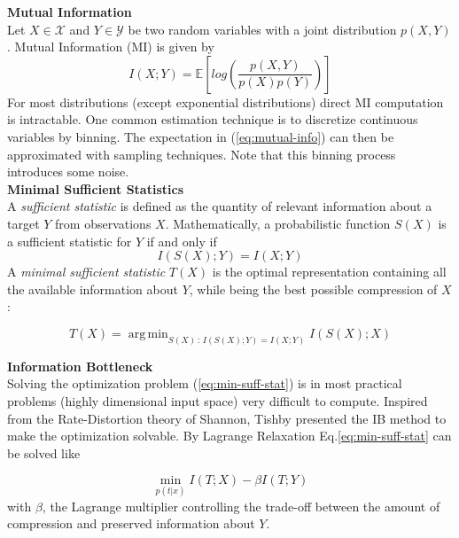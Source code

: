 \documentclass[twocolumn,superscriptaddress,aps]{revtex4-1}
\DeclareMathOperator*{\argmin}{arg\,min}
\begin{document}
\noindent \textbf{Mutual Information} \\[0.15cm]
\indent Let $X \in \mathcal{X}$ and $Y \in \mathcal{Y}$ be two random variables with a joint distribution $p(X,Y)$. Mutual Information (MI) is given by 
\begin{equation}
I(X;Y) = \mathbb{E} \left[log\left(\frac{p(X,Y)}{p(X)p(Y)} \right)\right]
\label{eq:mutual-info}
\end{equation}
For most distributions (except exponential distributions) direct MI computation is intractable. One common estimation technique is to discretize continuous variables by binning. The expectation in (\ref{eq:mutual-info}) can then be approximated with sampling techniques. Note that this binning process introduces some noise.\\

\noindent \textbf{Minimal Sufficient Statistics} \\[0.15cm]
\indent A \textit{sufficient statistic} is defined as the quantity of relevant information about a target $Y$ from observations $X$. Mathematically, a probabilistic function $S(X)$ is a sufficient statistic for $Y$ if and only if
\begin{equation}
I(S(X);Y) = I(X;Y)
\label{eq:suff-stat}
\end{equation}
A \textit{minimal sufficient statistic} $T(X)$ is the optimal representation containing all the available information about $Y$, while being the best possible compression of $X$:

\begin{equation}
T(X) = \argmin_{S(X) \, : \, I(S(X);Y) = I(X;Y)} I(S(X);X)
\label{eq:min-suff-stat}
\end{equation}

\noindent \textbf{Information Bottleneck} \\[0.15cm]
\indent Solving the optimization problem (\ref{eq:min-suff-stat}) is in most practical problems (highly dimensional input space) very difficult to compute. Inspired from the Rate-Distortion theory of Shannon, Tishby presented the IB method \citep{Tishby1} to make the optimization solvable. By Lagrange Relaxation Eq.\ref{eq:min-suff-stat} can be solved like

\begin{equation}
\min_{p(t|x)} I(T;X) - \beta I(T;Y)
\label{eq:lagrange}
\end{equation}
with $\beta$, the Lagrange multiplier controlling the trade-off between the amount of compression and preserved information about $Y$.
\end{document}
